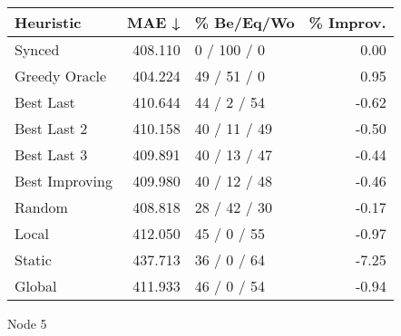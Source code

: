 \begin{tabular}{lrlr}
\toprule
\textbf{Heuristic} & \textbf{MAE ↓} & \textbf{\% Be/Eq/Wo} & \textbf{\% Improv.} \\
\midrule
            Synced &        408.110 &          0 / 100 / 0 &                0.00 \\
     Greedy Oracle &        404.224 &          49 / 51 / 0 &                0.95 \\
         Best Last &        410.644 &          44 / 2 / 54 &               -0.62 \\
       Best Last 2 &        410.158 &         40 / 11 / 49 &               -0.50 \\
       Best Last 3 &        409.891 &         40 / 13 / 47 &               -0.44 \\
    Best Improving &        409.980 &         40 / 12 / 48 &               -0.46 \\
            Random &        408.818 &         28 / 42 / 30 &               -0.17 \\
             Local &        412.050 &          45 / 0 / 55 &               -0.97 \\
            Static &        437.713 &          36 / 0 / 64 &               -7.25 \\
            Global &        411.933 &          46 / 0 / 54 &               -0.94 \\
\bottomrule
\end{tabular}
\caption{Node 5}
\label{tab:non_lr05_le1_bs2_5}
